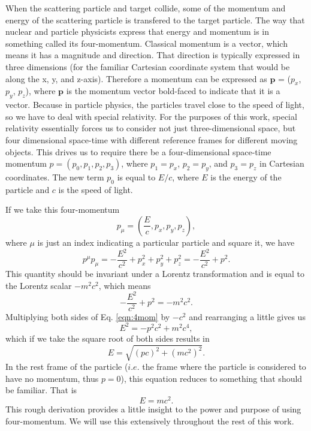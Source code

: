 When the scattering particle and target collide, some of the momentum and energy of the scattering particle is transfered to the target particle. The way that nuclear and particle physicists express that energy and momentum is in something called its four-momentum. Classical momentum is a vector, which means it has a magnitude and direction. That direction is typically expressed in three dimensions (for the familiar Cartesian coordinate system that would be along the x, y, and z-axis). Therefore a momentum can be expressed as $\mathbf{p}$ = ($p_x$, $p_y$, $p_z$), where $\mathbf{p}$ is the momentum vector bold-faced to indicate that it is a vector. Because in particle physics, the particles travel close to the speed of light, so we have to deal with special relativity. For the purposes of this work, special relativity essentially forces us to consider not just three-dimensional space, but four dimensional space-time with different reference frames for different moving objects. This drives us to require there be a four-dimensional space-time momentum $p=(p_0,p_1,p_2,p_3)$, where $p_1=p_x$, $p_2=p_y$, and $p_3=p_z$ in Cartesian coordinates. The new term $p_0$ is equal to $E/c$, where $E$ is the energy of the particle and $c$ is the speed of light.

If we take this four-momentum
\begin{equation}
p_{\mu} = \left( \frac{E}{c}, p_x, p_y, p_z \right),
\end{equation} 
where $\mu$ is just an index indicating a particular particle and square it, we have
\begin{equation}
p^{\mu}p_{\mu} = -\frac{E^2}{c^2} + p^2_x +p^2_y + p^2_z = -\frac{E^2}{c^2} + p^2.
\end{equation}
This quantity should be invariant under a Lorentz transformation and is equal to the Lorentz scalar $-m^2c^2$, which means 
\begin{equation}
\label{eqn:4mom}
-\frac{E^2}{c^2} + p^2 = -m^2c^2.
\end{equation}
Multiplying both sides of Eq. \ref{eqn:4mom} by $-c^2$ and rearranging a little gives us
\begin{equation}
\label{eqn:e_squared}
E^2 = - p^2c^2 + m^2c^4,
\end{equation}
which if we take the square root of both sides results in
\begin{equation}
E=\sqrt{(pc)^2+(mc^2)^2}.
\end{equation}
In the rest frame of the particle ($i.e.$ the frame where the particle is considered to have no momentum, thus $p=0$), this equation reduces to something that should be familiar. That is
\begin{equation}
E=mc^2.
\end{equation}
This rough derivation provides a little insight to the power and purpose of using four-momentum. We will use this extensively throughout the rest of this work. 

